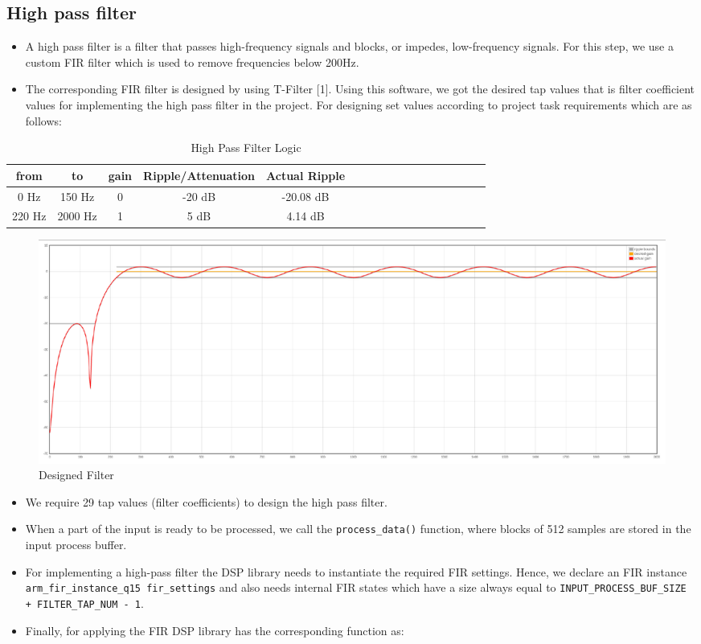 \documentclass[11pt]{article}
\begin{document}
\subsection{High pass filter}
\label{sec:orgfa5b1c4}

\begin{itemize}
\item A high pass filter is a filter that passes high-frequency signals and blocks, or impedes, low-frequency signals. For this step, we use a custom FIR filter which is used to remove frequencies below 200Hz.
\item The corresponding FIR filter is designed by using T-Filter [1]. Using this software, we got the desired tap values that is filter coefficient values for implementing the high pass filter in the project. For designing set values according to project task requirements which are as follows:
\end{itemize}


\begin{table}[htbp]
\centering
\begin{tabular}{|c|c|c|c|c|c|c|c|c|c|c|c|c|c|c|c|c|}
\hline
from & to & gain & Ripple/Attenuation & Actual Ripple\\
\hline
0 Hz & 150 Hz & 0 & -20 dB & -20.08 dB\\
220 Hz & 2000 Hz & 1 & 5 dB & 4.14 dB\\
\hline
\end{tabular}
\caption{High Pass Filter Logic}

\end{table}


\begin{figure}[H]
    \centering
    \includegraphics[width=1\textwidth, trim={0cm 0cm 0cm 0cm}, clip]{Filter.pdf}
    \caption{Designed Filter}
    \end{figure}


\begin{itemize}
\item We require 29 tap values (filter coefficients) to design the high pass filter.
\item When a part of the input is ready to be processed, we call the \texttt{process\_data()} function, where blocks of 512 samples are stored in the input process buffer.
\item For implementing a high-pass filter the DSP library needs to instantiate the required FIR settings. Hence, we declare an FIR instance \texttt{arm\_fir\_instance\_q15 fir\_settings} and also needs internal FIR states which have a size always equal to \texttt{INPUT\_PROCESS\_BUF\_SIZE + FILTER\_TAP\_NUM - 1}.
\item Finally, for applying the FIR DSP library has the corresponding function as:
\end{itemize}
\end{document}

